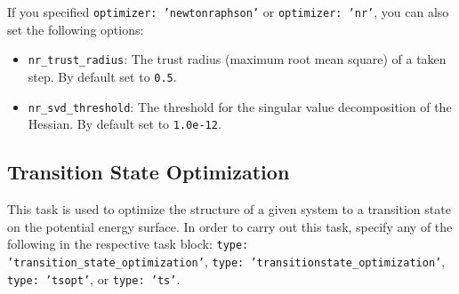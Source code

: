 \documentclass[]{tufte-book}
\begin{document}
If you specified \texttt{optimizer: 'newtonraphson'} or \texttt{optimizer: 'nr'}, you can also set the following options:
\begin{itemize}
\item \texttt{nr\_trust\_radius}: The trust radius (maximum root mean square) of a taken step. By default set to \texttt{0.5}.
\item \texttt{nr\_svd\_threshold}: The threshold for the singular value decomposition of the Hessian. By default set to
\texttt{1.0e-12}.
\end{itemize}

\subsection{Transition State Optimization}

This task is used to optimize the structure of a given system to a transition state on the potential energy surface. In 
order to carry out this task, specify any of the following in the respective task block: \texttt{type: 'transition\_state\_optimization'}, 
\texttt{type: 'transitionstate\_optimization'}, \texttt{type: 'tsopt'}, or \texttt{type: 'ts'}.
\end{document}
